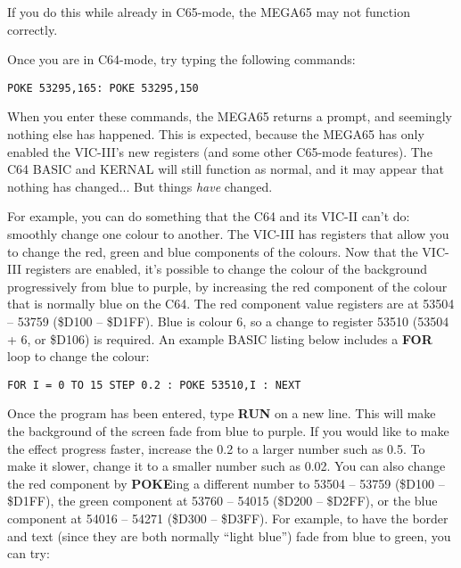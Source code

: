 If you do this while already in C65-mode, the MEGA65 may not function correctly.

Once you are in C64-mode, try typing the following commands:

\begin{tcolorbox}[colback=black,coltext=white]
\verbatimfont{\codefont}
\begin{verbatim}
POKE 53295,165: POKE 53295,150
\end{verbatim}
\end{tcolorbox}

When you enter these commands, the MEGA65 returns a  prompt, and seemingly nothing else has
happened.  This is expected, because the MEGA65 has only enabled the VIC-III's new registers (and some other
C65-mode features). The C64 BASIC and KERNAL will still function as normal, and it may appear
that nothing has changed... But things \textit{have} changed.

For example, you can do something that the C64 and its VIC-II can't do: smoothly change one colour to another.
The VIC-III has registers that allow you to change the red, green and blue components of the colours. Now that the VIC-III
registers are enabled, it's possible to change the colour of the background progressively from blue to purple, by increasing
the red component of the colour that is normally blue on the C64.  The red component value registers are at
53504 -- 53759 (\$D100 -- \$D1FF). Blue is colour 6, so a change to register 53510 (53504 + 6, or \$D106) is required.
An example BASIC listing below includes a {\bf FOR} loop to change the colour:

\begin{tcolorbox}[colback=black,coltext=white]
\verbatimfont{\codefont}
\begin{verbatim}
FOR I = 0 TO 15 STEP 0.2 : POKE 53510,I : NEXT
\end{verbatim}
\end{tcolorbox}

Once the program has been entered, type {\bf RUN} on a new line. This will make the background of the screen fade from
blue to purple.  If you would like to make the effect progress faster, increase the 0.2 to a larger number such as 0.5. To
make it slower, change it to a smaller number such as 0.02. You can also change the red component by {\bf POKE}ing a
different number to 53504 – 53759 (\$D100 – \$D1FF), the green component at 53760 -- 54015 (\$D200 -- \$D2FF), or the
blue component at 54016 -- 54271 (\$D300 -- \$D3FF).  For example, to have
the border and text (since they are both normally ``light blue'') fade from blue to green, you can try:

